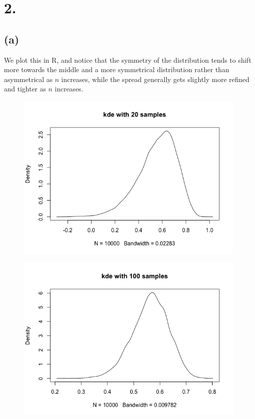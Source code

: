 \documentclass{article}
\begin{document}
\section*{2.}
{\Large

\subsection*{(a)}

We plot this in R, and notice that the symmetry of the distribution tends to shift more towards the middle and a more symmetrical distribution rather than asymmetrical as $n$ increases, while the spread generally gets slightly more refined and tighter as $n$ increases.
\begin{figure}[h!]
  \centering
  \includegraphics[width=450pt]{hw5_2a_20.png}
\end{figure}
\begin{figure}[t!]
  \centering
  \includegraphics[width=450pt]{hw5_2a_100.png}

\end{figure}}
\end{document}
